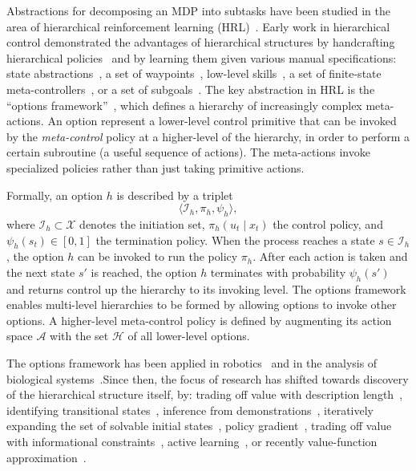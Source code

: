 Abstractions for decomposing an MDP into subtasks have been studied in the area of hierarchical reinforcement learning (HRL)~\cite{parr98,suttonPS99,barto03}.
Early work in hierarchical control demonstrated the advantages of hierarchical structures by handcrafting hierarchical policies~\cite{brooks1986robust} and by learning them given various manual specifications: state abstractions~\cite{dayanH92,hengst02,kolterAN07,konidarisB07}, a set of waypoints~\cite{kaelbling93}, low-level skills~\cite{huberG97,baconP15,liaw17composing}, a set of finite-state meta-controllers~\cite{parrR97}, or a set of subgoals~\cite{suttonPS99,dietterich00}.
The key abstraction in HRL is the ``options framework''~\cite{suttonPS99}, which defines a hierarchy of increasingly complex meta-actions.
 An option represent a lower-level control primitive that can be invoked by the \emph{meta-control} policy at a higher-level of the hierarchy, in order to perform a certain subroutine (a useful sequence of actions).
The meta-actions invoke specialized policies rather than just taking primitive actions.

 Formally, an option $h$ is described by a triplet \[\langle \mathcal{I}_h, \pi_h, \psi_h \rangle,\] where $\mathcal{I}_h \subset \mathcal{X}$ denotes the initiation set, $\pi_h(u_t \mid x_t)$ the control policy, and $\psi_h(s_t) \in [0,1]$ the termination policy. When the process reaches a state $s \in \mathcal{I}_h$, the option $h$ can be invoked to run the policy $\pi_h$. After each action is taken and the next state $s'$ is reached, the option $h$ terminates with probability $\psi_h(s')$ and returns control up the hierarchy to its invoking level. The options framework enables multi-level hierarchies to be formed by allowing options to invoke other options. A higher-level meta-control policy is defined by augmenting its action space $\mathcal{A}$ with the set $\mathcal{H}$ of all lower-level options. 

The options framework has been applied in robotics~\cite{konidarisKGB12, krishnan2016swirl, sermanet2016unsupervised} and in the analysis of biological systems~\cite{botvinick08,botvinick2009hierarchically,solway2014optimal,zacksKEH11,whitenFBL06}.Since then, the focus of research has shifted towards discovery of the hierarchical structure itself, by: trading off value with description length~\cite{thrunS94}, identifying transitional states~\cite{mcgovernB01,menacheMS02,simsekB04,stolle04,lakshminarayananKKR16}, inference from demonstrations~\cite{buiVW02,krishnan2015transition,daniel2012hierarchical,krishnan2016swirl}, iteratively expanding the set of solvable initial states~\cite{konidarisB09,konidarisKGB12}, policy gradient~\cite{LevyS11}, trading off value with informational constraints~\cite{geneweinLGB15,foxMT16,jonssonG16,florensaDA17}, active learning~\cite{hamidiTGF15}, or recently value-function approximation~\cite{baconHP16,heess2016learning,sharmaLR17}.


